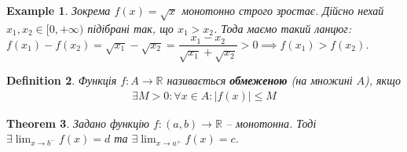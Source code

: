 \documentclass[a4paper, 14pt]{article}
\theoremstyle{theoremdd}
\newtheorem{theorem}{Theorem}[subsection]
\theoremstyle{theoremdd}
\newtheorem{definition}[theorem]{Definition}
\theoremstyle{theoremdd}
\theoremstyle{theoremdd}
\newtheorem{example}[theorem]{Example}
\theoremstyle{theoremdd}
\theoremstyle{theoremdd}
\theoremstyle{theoremdd}
\theoremstyle{theoremdd}
\begin{document}
\begin{example}
Зокрема $f(x) = \sqrt{x}$ монотонно строго зростає. Дійсно нехай $x_1,x_2 \in [0,+\infty)$ підібрані так, що $x_1 > x_2$. Тода маємо такий ланцюг:\\
$f(x_1) - f(x_2) = \sqrt{x_1} - \sqrt{x_2} = \dfrac{x_1-x_2}{\sqrt{x_1} + \sqrt{x_2}} > 0 \implies f(x_1) > f(x_2)$.
\end{example}

\begin{definition}
Функція $f \colon A \to \mathbb{R}$ називається \textbf{обмеженою} (на множині $A$), якщо
\begin{align*}
\exists M > 0: \forall x \in A: |f(x)| \leq M
\end{align*}
\end{definition}

\begin{theorem}
Задано функцію $f \colon (a,b) \to \mathbb{R}$ -- монотонна. Тоді $\displaystyle \exists \lim_{x \to b^-} f(x) = d$ та $\displaystyle \exists \lim_{x \to a^+} f(x) = c$.
\end{theorem}
\end{document}
